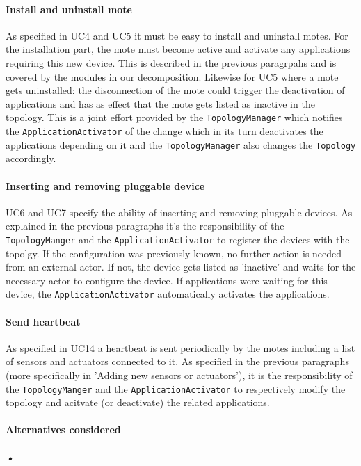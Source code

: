 \documentclass[english]{sareport}
\begin{document}
\paragraph{Install and uninstall mote}
As specified in UC4 and UC5 it must be easy to install and uninstall motes. For the installation part, the mote must become active and activate any applications requiring this new device. This is described in the previous paragrpahs and is covered by the modules in our decomposition. Likewise for UC5 where a mote gets uninstalled: the disconnection of the mote could trigger the deactivation of applications and has as effect that the mote gets listed as inactive in the topology. This is a joint effort provided by the \texttt{TopologyManager} which notifies the \texttt{ApplicationActivator} of the change which in its turn deactivates the applications depending on it and the \texttt{TopologyManager} also changes the \texttt{Topology} accordingly.

\paragraph{Inserting and removing pluggable device}
UC6 and UC7 specify the ability of inserting and removing pluggable devices. As explained in the previous paragraphs it's the responsibility of the \texttt{TopologyManger} and the \texttt{ApplicationActivator} to register the devices with the topolgy. If the configuration was previously known, no further action is needed from an external actor. If not, the device gets listed as 'inactive' and waits for the necessary actor to configure the device. If applications were waiting for this device, the \texttt{ApplicationActivator} automatically activates the applications. 

\paragraph{Send heartbeat}
As specified in UC14 a heartbeat is sent periodically by the motes including a list of sensors and actuators connected to it. As specified in the previous paragraphs (more specifically in 'Adding new sensors or actuators'), it is the responsibility of the \texttt{TopologyManger} and the \texttt{ApplicationActivator} to respectively modify the topology and acitvate (or deactivate) the related applications.

\paragraph{Alternatives considered}
\subparagraph{•}
\end{document}
